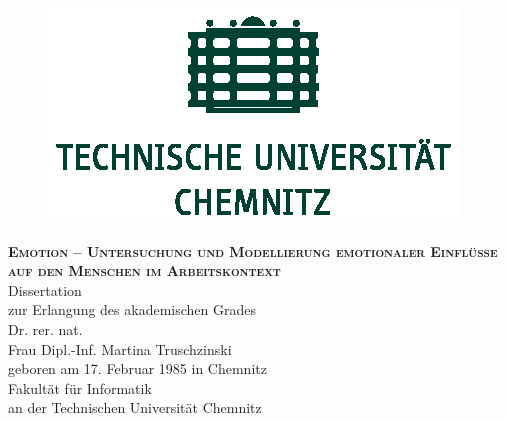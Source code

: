 \documentclass[12pt]{book}
\begin{document}
\begin{titlepage}
\begin{center}


\begin{figure}[h]
\begin{center}
\includegraphics{TU_Chemnitz_positiv_gruen.eps}
\end{center}
\end{figure}

\vspace{3em}

\textsc{\large \textbf{Emotion – Untersuchung und Modellierung emotionaler Einflüsse auf den
Menschen im Arbeitskontext}}\\[4em]

\textnormal{Dissertation}\\

\textnormal{zur Erlangung des akademischen Grades}\\[2em]

\textnormal{Dr. rer. nat.}\\[2em]


\textnormal{Frau Dipl.-Inf. Martina Truschzinski}\\

\textnormal{geboren am 17. Februar 1985 in Chemnitz}\\[3em]

\textnormal{Fakultät für Informatik}\\
\textnormal{an der Technischen Universität Chemnitz}

\end{center}

\vspace*{\fill}


\end{titlepage}


\end{document}
